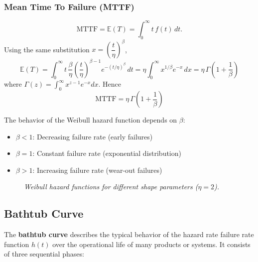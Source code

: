 \documentclass[twoside]{book}
\begin{document}
\subsubsection{Mean Time To Failure (MTTF)}
\[
\text{MTTF} = \mathbb{E}(T) = \int_0^\infty t\,f(t)\,dt.
\]
Using the same substitution \(x=\left(\dfrac{t}{\eta}\right)^\beta\),
\[
\mathbb{E}(T)
= \int_{0}^{\infty} t \,\dfrac{\beta}{\eta}\left(\dfrac{t}{\eta}\right)^{\beta-1} e^{-(t/\eta)^\beta}\,dt
= \eta \int_{0}^{\infty} x^{1/\beta} e^{-x}\,dx
= \eta\,\Gamma\left( 1 + \dfrac{1}{\beta}\right)
\]
where \(\Gamma(z)=\int_0^\infty x^{z-1}e^{-x}dx\).  Hence
\[
\text{MTTF} = \eta\,\Gamma\left( 1 + \dfrac{1}{\beta}\right)
\]

The behavior of the Weibull hazard function depends on $\beta$:
\begin{itemize}
\item $\beta < 1$: Decreasing failure rate (early failures)
\item $\beta = 1$: Constant failure rate (exponential distribution)
\item $\beta > 1$: Increasing failure rate (wear-out failures)
\end{itemize}

\begin{figure}[H]
\centering
{}
\caption{\textit{Weibull hazard functions for different shape parameters ($\eta = 2$).}}
\end{figure}

\subsection{Bathtub Curve}

The \textbf{bathtub curve} describes the typical behavior of the hazard rate {failure rate function} \( h(t) \) over the operational life of many products or systems. It consists of three sequential phases:
\end{document}
